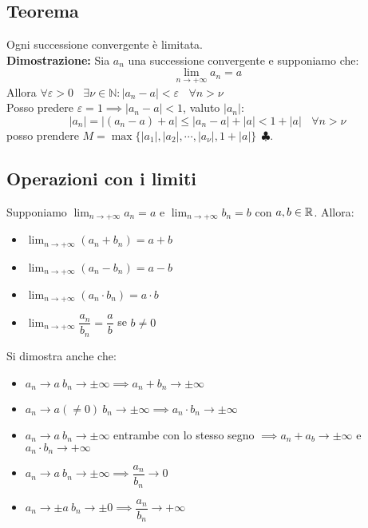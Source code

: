\subsection{Teorema}
Ogni successione convergente è limitata.\\ \textbf{Dimostrazione:} Sia $a_n$
una successione convergente e supponiamo che:
\[
    \lim_{n\to+\infty}a_n = a
\]
Allora $\forall\varepsilon > 0 \ \ \ \ \exists \nu \in \mathbb{N} : |a_n - a| <
    \varepsilon \ \ \ \ \forall n > \nu$\\ Posso predere $\varepsilon = 1 \implies
    |a_n - a|<1$, valuto $|a_n|$:
\[
    |a_n| = |(a_n-a) + a| \leq |a_n-a| + |a| < 1 + |a| \ \ \ \ \forall n > \nu
\]
posso prendere $M = \max\{|a_1|, |a_2|, \cdots, |a_\nu|, 1+|a|\} \ \
    \clubsuit$.

\subsection{Operazioni con i limiti}
Supponiamo $\lim_{n\to+\infty} a_n = a$ e $\lim_{n\to+\infty} b_n = b$ con $a,
    b \in \mathbb{R}$. Allora:
\begin{itemize}
    \item $\lim_{n\to+\infty} (a_n + b_n) = a + b$
    \item $\lim_{n\to+\infty} (a_n - b_n) = a - b$
    \item $\lim_{n\to+\infty} (a_n \cdot b_n) = a \cdot b$
    \item $\lim_{n\to+\infty} \dfrac{a_n}{b_n} = \dfrac{a}{b}$ se $b \neq 0$
\end{itemize}
Si dimostra anche che:
\begin{itemize}
    \item $a_n \to a \ b_n \to \pm\infty \implies a_n + b_n \to \pm\infty$
    \item $a_n \to a (\ne0) \ b_n \to\pm\infty \implies a_n\cdot b_n \to \pm\infty$
    \item $a_n \to a \ b_n \to \pm\infty$ entrambe con lo stesso segno $\implies a_n + a_b \to \pm\infty$ e $a_n\cdot b_n \to +\infty$
    \item $a_n \to a \ b_n\to\pm\infty \implies \dfrac{a_n}{b_n} \to 0$
    \item $a_n \to \pm a \ b_n \to \pm0 \implies \dfrac{a_n}{b_n} \to +\infty$
\end{itemize}

